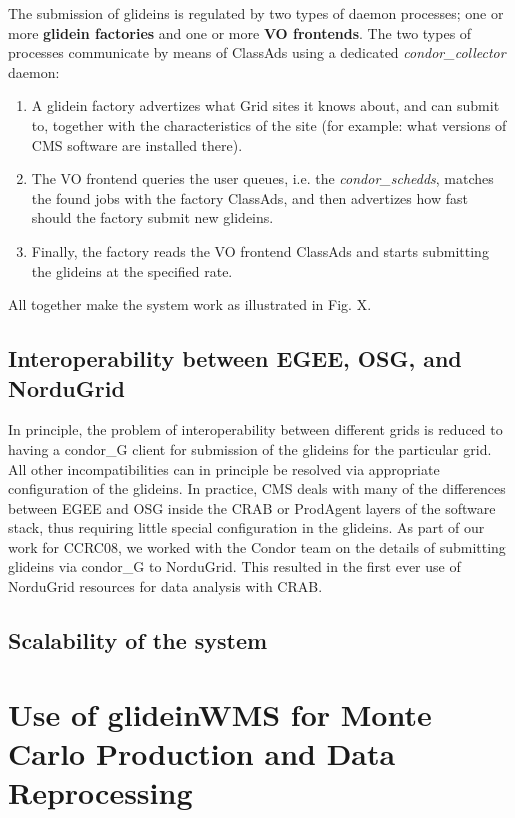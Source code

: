 \documentclass[a4paper]{jpconf}
\begin{document}
The submission of glideins is regulated by two types of daemon processes; 
one or more \textbf{glidein factories} and one or more \textbf{VO frontends}. 
The two types of processes communicate by means of ClassAds using a dedicated \emph{condor\_collector} daemon:
\begin{enumerate}
\item A glidein factory advertizes what Grid sites it knows about, and can submit to, together with the characteristics of the site 
(for example: what versions of CMS software are installed there).
\item The VO frontend queries the user queues, i.e. the \emph{condor\_schedds}, 
matches the found jobs with the factory ClassAds, 
and then advertizes how fast should the factory submit new glideins.
\item Finally, the factory reads the VO frontend ClassAds and starts submitting the glideins at the specified rate.
\end{enumerate}

All together make the system work as illustrated in Fig. X.

\subsection {Interoperability between EGEE, OSG, and NorduGrid}
In principle, the problem of interoperability between different grids is reduced to having a condor\_G client
for submission of the glideins for the particular grid. All other incompatibilities can in principle be resolved via appropriate
configuration of the glideins. In practice, CMS deals with many of the differences between EGEE and OSG inside the CRAB or ProdAgent
layers of the software stack, thus requiring little special configuration in the glideins.
As part of our work for CCRC08, we worked with the Condor team
on the details of submitting glideins via condor\_G to NorduGrid. This resulted in the first ever use of NorduGrid resources for
data analysis with CRAB. 

\subsection {Scalability of the system}



\section{Use of glideinWMS for Monte Carlo Production and Data Reprocessing }
\end{document}
